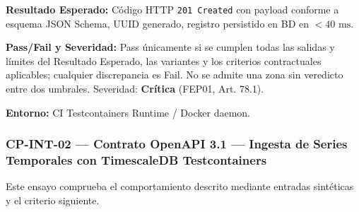 \par\noindent\textbf{Resultado Esperado:} Código HTTP \texttt{2\allowbreak{}0\allowbreak{}1\allowbreak{} C\allowbreak{}r\allowbreak{}e\allowbreak{}a\allowbreak{}t\allowbreak{}e\allowbreak{}d\allowbreak{}} con payload conforme a esquema JSON Schema, UUID generado, registro persistido en BD en \(< 40\text{ ms}\).\par
\par\noindent\textbf{Pass/Fail y Severidad:} Pass únicamente si se cumplen todas las salidas y límites del Resultado Esperado, las variantes y los criterios contractuales aplicables; cualquier discrepancia es Fail. No se admite una zona sin veredicto entre dos umbrales. Severidad: \textbf{Crítica} (FEP01, Art. 78.1).\par
\par\noindent\textbf{Entorno:} CI Testcontainers Runtime / Docker daemon.\par






\subsubsection*{CP-INT-02 — Contrato OpenAPI 3.1 — Ingesta de Series Temporales con TimescaleDB Testcontainers}\label{sec:9-cp-int-02}
Este ensayo comprueba el comportamiento descrito mediante entradas sintéticas y el criterio siguiente.

